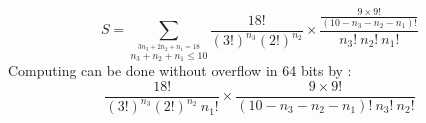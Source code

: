 \documentclass[10pt,a4paper]{letter}
\begin{document}
$$
S = \sum_{\stackrel{3 n_3+2 n_2+n_1=18}{n_3+n_2+n_1\leq10}} \frac{18!}{(3!)^{n_3}(2!)^{n_2}}\times \frac{\frac{9\times 9!}{(10-n_3-n_2-n_1)!}}
{n_3!\ n_2!\ n_1!} 
$$
Computing can be done without overflow in 64 bits by :
$$
\frac{18!}{(3!)^{n_3}(2!)^{n_2}\ n_1!}\times 
\frac{9\times 9!}{(10-n_3-n_2-n_1)!\ n_3!\ n_2!}
$$
\end{document}
